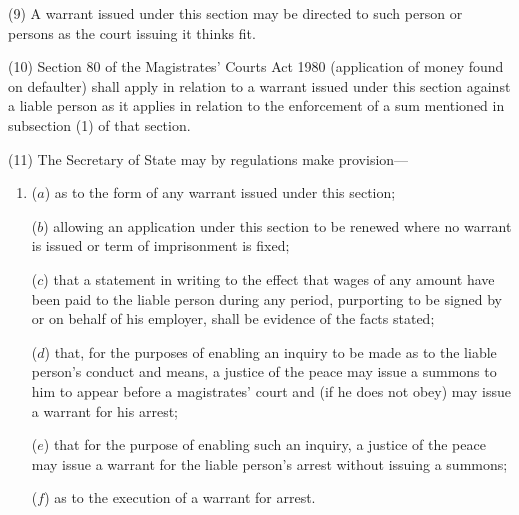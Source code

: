 \documentclass[12pt,a4paper]{article}
\begin{document}
(9) A warrant issued under this section may be directed to such person or persons as the court issuing it thinks fit.

(10) Section 80 of the Magistrates' Courts Act 1980 (application of money found on defaulter) shall apply in relation to a warrant issued under this section against a liable person as it applies in relation to the enforcement of a sum mentioned in subsection (1)  of that section.

%
%
%
%

(11) The Secretary of State may by regulations make provision—
\begin{enumerate}\item[]
($a$) as to the form of any warrant issued under this section;

($b$) allowing an application under this section to be renewed where no warrant is issued or term of imprisonment is fixed;

($c$) that a statement in writing to the effect that wages of any amount have been paid to the liable person during any period, purporting to be signed by or on behalf of his employer, shall be evidence of the facts stated;

($d$) that, for the purposes of enabling an inquiry to be made as to the liable person’s conduct and means, a justice of the peace may issue a summons to him to appear before a magistrates' court and (if he does not obey) may issue a warrant for his arrest;

($e$) that for the purpose of enabling such an inquiry, a justice of the peace may issue a warrant for the liable person’s arrest without issuing a summons;

($f$) as to the execution of a warrant for arrest.
\end{enumerate}
\end{document}
